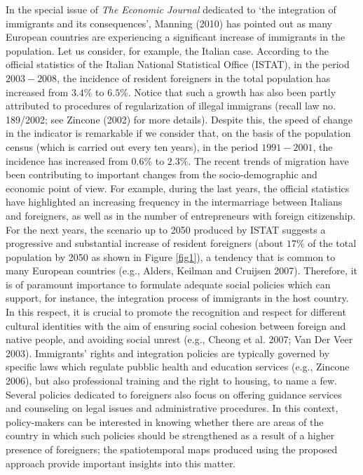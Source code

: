 \documentclass[10pt] {article}
\theoremstyle{definition}
\theoremstyle{plain}
\begin{document}
In the special issue of \textit{The Economic Journal} dedicated to `the integration of immigrants and its consequences', Manning (2010) has pointed out as many European countries are experiencing a significant increase of immigrants in the population. Let us consider, for example, the Italian case. According to the official statistics of the Italian National Statistical Office (ISTAT), in the period $2003-2008$, the incidence of resident foreigners in the total population has increased from $3.4\%$ to $6.5\%$. Notice that such a growth has also been partly attributed to procedures of regularization of illegal immigrans (recall law no. 189/2002; see Zincone (2002) for more details). Despite this, the speed of change in the indicator is remarkable if we consider that, on the basis of the population census (which is carried out every ten years), in the period $1991-2001$, the incidence has increased from $0.6\%$ to $2.3\%$. The recent trends of migration have been contributing to important changes from the socio-demographic and economic point of view. For example, during the last years, the official statistics have highlighted an increasing frequency in the intermarriage between Italians and foreigners, as well as in the number of entrepreneurs with foreign citizenship. For the next years, the scenario up to 2050 produced by ISTAT suggests a progressive and substantial increase of resident foreigners (about $17\%$ of the total population by 2050 as shown in Figure \ref{fig1}), a tendency that is common to many European countries (e.g., Alders, Keilman and Cruijsen 2007). Therefore, it is of paramount importance to formulate adequate social policies which can support, for instance, the integration process of immigrants in the host country. In this respect, it is crucial to promote the recognition and respect for different cultural identities with the aim of ensuring social cohesion between foreign and native people, and avoiding social unrest (e.g., Cheong et al. 2007; Van Der Veer 2003). Immigrants' rights and integration policies are typically governed by specific laws which regulate pubblic health and education services (e.g., Zincone 2006), but also professional training and the right to housing, to name a few. Several policies dedicated to foreigners also focus on offering guidance services and counseling on legal issues and administrative procedures. In this context, policy-makers can be interested in knowing whether there are areas of the country in which such policies should be strengthened as a result of a higher presence of foreigners; the spatiotemporal maps produced using the proposed approach provide important insights into this matter. 
\end{document}
